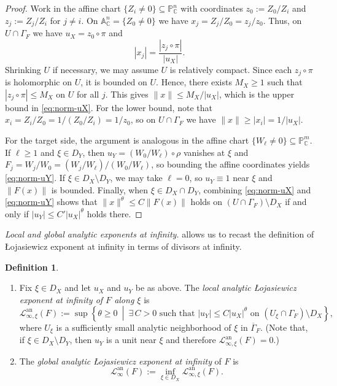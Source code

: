 \documentclass[12pt]{amsart}
\newcommand{\CC}{\mathbb{C}}
\newcommand{\PP}{\mathbb{P}}
\renewcommand{\AA}{\mathbb{A}}
\newcommand{\Loj}{\mathcal{L}} %
\theoremstyle{plain}
\theoremstyle{definition}
\newtheorem{definition}[theorem]{Definition}
\numberwithin{equation}{section}
\begin{document}
\begin{proof}
Work in the affine chart $\{Z_i\neq 0\}\subseteq \PP^n_\CC$ with coordinates
$z_0:=Z_0/Z_i$ and $z_j:=Z_j/Z_i$ for $j\neq i$.
On $\AA^n_\CC=\{Z_0\neq 0\}$ we have $x_j=Z_j/Z_0=z_j/z_0$.
Thus, on $U\cap\Gamma_F$ we have $u_X=z_0\circ\pi$ and
\[
|x_j|=\frac{|z_j\circ\pi|}{|u_X|}.
\]
Shrinking $U$ if necessary, we may assume $U$ is relatively compact.
Since each $z_j\circ\pi$ is holomorphic on $U$, it is bounded on $U$.
Hence, there exists $M_X\ge 1$ such that $|z_j\circ\pi|\le M_X$ on $U$ for all $j$.
This gives $\|x\|\le M_X/|u_X|$, which is the upper bound in \eqref{eq:norm-uX}.
For the lower bound, note that $x_i=Z_i/Z_0=1/(Z_0/Z_i)=1/z_0$, so on $U\cap\Gamma_F$ we have
$\|x\|\ge |x_i|=1/|u_X|$.

For the target side, the argument is analogous in the affine chart $\{W_\ell\neq 0\}\subseteq \PP^m_\CC$.
If $\ell\ge 1$ and $\xi\in D_Y$, then $u_Y=(W_0/W_\ell)\circ\rho$ vanishes at $\xi$ and
$F_j=W_j/W_0=(W_j/W_\ell)/(W_0/W_\ell)$, so bounding the affine coordinates yields \eqref{eq:norm-uY}.
If $\xi\in D_X\setminus D_Y$, we may take $\ell=0$, so $u_Y\equiv 1$ near $\xi$ and $\|F(x)\|$ is bounded.
Finally, when $\xi\in D_X\cap D_Y$, combining \eqref{eq:norm-uX} and \eqref{eq:norm-uY} shows that
$\|x\|^\theta \le C\|F(x)\|$ holds on $(U\cap\Gamma_F)\setminus D_X$ if and only if
$|u_Y|\le C'|u_X|^\theta$ holds there.
\end{proof}

\medskip
\noindent\textit{Local and global analytic exponents at infinity.}  allows us to recast the definition of \L{}ojasiewicz exponent at infinity in terms of divisors at infinity.

\begin{definition}\label{def:local-analytic-loj-infty}  \quad
\begin{enumerate} 
\item Fix $\xi\in D_X$ and let $u_X$ and $u_Y$ be as above. The \emph{local analytic \L{}ojasiewicz exponent at infinity of $F$ along $\xi$} is
\[
\Loj^{\text{an}}_{\infty,\xi}(F)
:=
\sup\left\{
\theta\ge 0
\ \middle|\
\exists\,C>0 \text{ such that } |u_Y|\le C|u_X|^\theta
\text{ on } (U_\xi\cap\Gamma_F)\setminus D_X
\right\},
\]
where $U_\xi$ is a sufficiently small analytic neighborhood of $\xi$ in $\overline{\Gamma}_F$. (Note that, if $\xi\in D_X\setminus D_Y$, then $u_Y$ is a unit near $\xi$ and therefore
$\Loj^{\text{an}}_{\infty,\xi}(F)=0$.)
\item The \emph{global analytic \L{}ojasiewicz exponent at infinity} of $F$ is
\[
\Loj^{\text{an}}_{\infty}(F)
:=
\inf_{\xi\in D_X}\Loj^{\text{an}}_{\infty,\xi}(F).
\]
\end{enumerate}
\end{definition}
\end{document}
